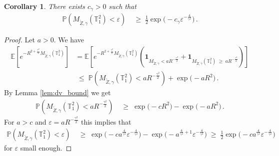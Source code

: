\documentclass[11pt]{article}
\numberwithin{equation}{section}
\newtheorem{corollary}[theorem]{Corollary}
\theoremstyle{definition}
\renewcommand{\tilde}{\widetilde}          %
\renewcommand{\leq}{\;\leqslant\;}                   %
\renewcommand{\geq}{\;\geqslant\;}                   %
\newcommand{\E}{\mathbb{E}}
\renewcommand{\P}{\mathbb{P}}
\def\eps{\varepsilon}
\def\T{\mathbb{T}}
\newcommand{\tor}{{\T_1^2}}
\begin{document}
	\begin{corollary}
	There exists $c_\gamma > 0$ such that 
	\begin{align*}
	\P(M_{\tilde Z,\gamma}(\tor) < \eps) & \geq \tfrac 12 \exp \big( - c_\gamma \eps^{- \frac{4}{\gamma^2}} \big)\,.
	\end{align*}
	\end{corollary}
	\begin{proof}
	Let $a>0$. We have 
	\begin{align*}
	\E[e^{ - R^{2 + \frac{\gamma^2}{2}} M_{\tilde Z,\gamma}(\tor)}] &= \E[e^{ - R^{2 + \frac{\gamma^2}{2}} M_{\tilde Z,\gamma}(\tor)} ( \mathbf{1}_{M_{\tilde Z,\gamma} < a R^{- \frac{\gamma^2}{2}}} + \mathbf{1}_{M_{\tilde Z,\gamma}(\tor) \geq a R^{- \frac{\gamma^2}{2}} })]\\
	& \leq \P(M_{\tilde Z,\gamma}(\tor) < a R^{- \frac{\gamma^2}{2}} ) + \exp \big(- a R^{2 } \big) \,.
	\end{align*}
	By Lemma \ref{lem:dv_bound} we get
	\begin{align*}
	\P(M_{\tilde Z,\gamma}(\tor) < a R^{- \frac{\gamma^2}{2}}) & \geq \exp \big(- c R^2 \big) - \exp \big(- aR^{2 }  \big) \,.
	\end{align*}
	For $a > c$ and $\eps = aR^{- \frac{\gamma^2}{2}}$ this implies that 
	\begin{align*}
	\P(M_{\tilde Z,\gamma}(\tor) < \eps) & \geq \exp \big( - c a^{\frac{4}{\gamma^2}} \eps^{ - \frac{4}{\gamma^2}} \big)  - \exp \big( - a^{\frac{4}{\gamma^2}+1} \eps^{- \frac{4}{\gamma^2}} \big)  \geq \tfrac 12 \exp \big( - c a^{\frac{4}{\gamma^2}} \eps^{ - \frac{4}{\gamma^2}} \big)
	\end{align*}
	for $\eps$ small enough.
	\end{proof}
	
\end{document}
